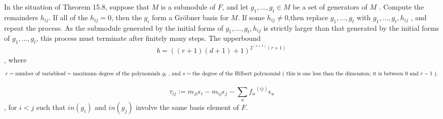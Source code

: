 \documentclass{article}
\begin{document}
\begin{algo}
	In the situation of Theorem 15.8, suppose that \( M \) is a submodule of \( F \), and let
	\( g_1,\dots,g_t \in M \)
	be a set of generators of \( M \) .
	Compute the remainders \( h_{ij} \).
	If all of the \( h_{ij}=0 \), then the \( g_i \) form a Gr\"obner basis for \( M \).
	If some \( h_{ij} \neq 0\),then replace 
	\( g_1, \dots,g_t \)
	with 
	\( g_1, \dots,g_t,h_{ij} \)
	, and repeat the process.
	As the submodule generated by the initial forms of
	\(g_1,\dots,g_t,h_{ij} \)
	is strictly larger than that generated by the initial forms of
	\( g_1, \dots,g_t \),
	this process must terminate after finitely many steps.
	The upperbound \[
		b=\left( \left( r+1 \right)\left( d+1 \right)+1 \right)^{2^{(s+1)}(r+1) }
	\],
	where 
	\[
		r = \text{number of variables} \\
		d = \text{maximum degree of the polynomials \( g_i\) , and } \\
		s = \text{the degree of the Hilbert polynomial ( this is one less than the dimension; it is between \( 0 \) and \(r-1\) ).}
	\]
\end{algo}
\begin{defn}[\nocite{Eis1}{334}]
	\[
		\tau_{ij}:=m_{ji}\epsilon_{i} - m_{ij} \epsilon_{j} - \sum_{u} {f_{u}}^{\left( ij \right) } \epsilon_{u} 
	\],
	for \( i < j \) such that \( in \left( g_{i}  \right) \) and \( in \left( g_{j}  \right) \)
	involve the same basis element of \( F \).
\end{defn}


\end{document}
